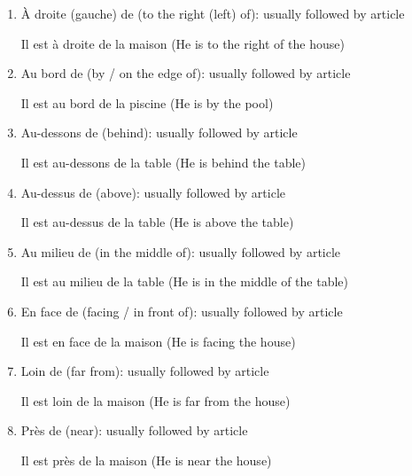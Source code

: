\documentclass{book}
\begin{document}
\begin{enumerate}
\begin{center}
                    Il est à côté de la maison (He is next to the house)
                \end{center}
            \item À droite (gauche) de (to the right (left) of): usually followed by article
                \begin{center}
                    Il est à droite de la maison (He is to the right of the house)
                \end{center}
            \item Au bord de (by / on the edge of): usually followed by article
                \begin{center}
                    Il est au bord de la piscine (He is by the pool)
                \end{center}
            \item Au-dessons de (behind): usually followed by article
                \begin{center}
                    Il est au-dessons de la table (He is behind the table)
                \end{center}
            \item Au-dessus de (above): usually followed by article
                \begin{center}
                    Il est au-dessus de la table (He is above the table)
                \end{center}
            \item Au milieu de (in the middle of): usually followed by article
                \begin{center}
                    Il est au milieu de la table (He is in the middle of the table)
                \end{center}
            \item En face de (facing / in front of): usually followed by article
                \begin{center}
                    Il est en face de la maison (He is facing the house)
                \end{center}
            \item Loin de (far from): usually followed by article
                \begin{center}
                    Il est loin de la maison (He is far from the house)
                \end{center}
            \item Près de (near): usually followed by article
                \begin{center}
                    Il est près de la maison (He is near the house)
                \end{center}
        \end{enumerate}
    
\end{document}
